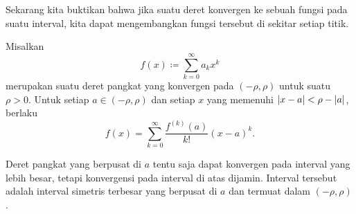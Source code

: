 Sekarang kita buktikan bahwa jika suatu deret konvergen ke sebuah fungsi
pada suatu interval, kita dapat mengembangkan fungsi tersebut di sekitar setiap titik.

\begin{thm}
%
\label{thm:tayloranal}
Misalkan
\begin{equation*}
f(x) \coloneqq \sum_{k=0}^\infty a_k x^k
\end{equation*}
merupakan suatu deret pangkat yang konvergen pada $(-\rho,\rho)$ untuk suatu $\rho > 0$.  Untuk setiap $a \in
(-\rho,\rho)$
dan setiap $x$ yang memenuhi $\lvert {x-a} \rvert < \rho-\lvert {a} \rvert$, berlaku
\begin{equation*}
f(x) =
\sum_{k=0}^\infty \frac{f^{(k)}(a)}{k!} {(x-a)}^{k} .
\end{equation*}
\end{thm}

Deret pangkat yang berpusat di $a$ tentu saja dapat konvergen pada interval yang lebih besar, tetapi
konvergensi pada interval di atas dijamin.  Interval tersebut adalah interval simetris terbesar yang berpusat di
$a$ dan termuat dalam $(-\rho,\rho)$.

